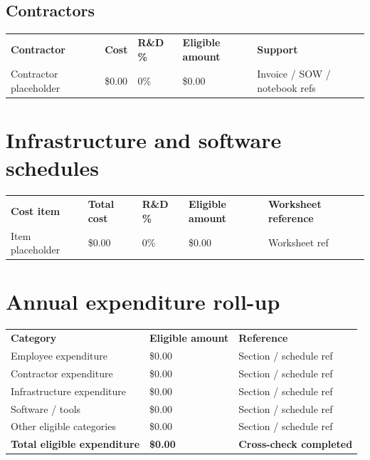 \documentclass[11pt]{article}
\begin{document}
\subsection{Contractors}
\begin{xltabular}{\textwidth}{L{3.3cm}L{1.9cm}L{1.8cm}L{2.0cm}Y}
\textbf{Contractor} & \textbf{Cost} & \textbf{R\&D \%} & \textbf{Eligible amount} & \textbf{Support} \\
{Contractor placeholder} & {\$0.00} & {0\%} & {\$0.00} & {Invoice / SOW / notebook refs} \\
\end{xltabular}

\section{Infrastructure and software schedules}
\begin{xltabular}{\textwidth}{L{3.8cm}L{1.9cm}L{1.8cm}L{2.0cm}Y}
\textbf{Cost item} & \textbf{Total cost} & \textbf{R\&D \%} & \textbf{Eligible amount} & \textbf{Worksheet reference} \\
{Item placeholder} & {\$0.00} & {0\%} & {\$0.00} & {Worksheet ref} \\
\end{xltabular}

\section{Annual expenditure roll-up}
\begin{tabularx}{\textwidth}{L{5.1cm}L{2.2cm}Y}
\textbf{Category} & \textbf{Eligible amount} & \textbf{Reference} \\
Employee expenditure & {\$0.00} & {Section / schedule ref} \\
Contractor expenditure & {\$0.00} & {Section / schedule ref} \\
Infrastructure expenditure & {\$0.00} & {Section / schedule ref} \\
Software / tools & {\$0.00} & {Section / schedule ref} \\
Other eligible categories & {\$0.00} & {Section / schedule ref} \\
\textbf{Total eligible expenditure} & \textbf{\$0.00} & \textbf{Cross-check completed} \\
\end{tabularx}
\end{document}
